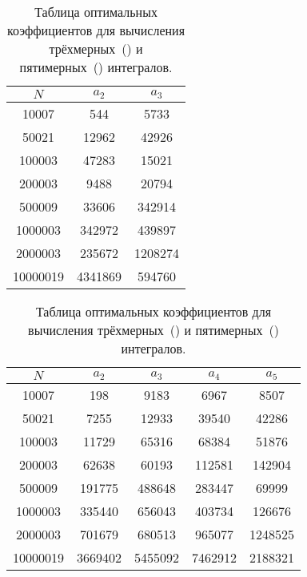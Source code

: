 \documentclass[a4paper,12pt]{article}
\begin{document}
\begin{table}
    \caption{Таблица оптимальных коэффициентов для вычисления трёхмерных~()
        и пятимерных~() интегралов.}
    \label{tab:Korobov}
    {\footnotesize
    \begin{subtable}[b]{.4\linewidth}
        \centering
    	\subcaption{}\label{tab:Korobov-a}
        \begin{tabular}{|c|c|c|}\hline
               \(N\) & \(a_2\) & \(a_3\)  \\\hline
               10007 &     544 &    5733  \\
               50021 &   12962 &   42926  \\
              100003 &   47283 &   15021  \\
              200003 &    9488 &   20794  \\
              500009 &   33606 &  342914  \\
             1000003 &  342972 &  439897  \\
             2000003 &  235672 & 1208274  \\
            10000019 & 4341869 &  594760  \\\hline
    	\end{tabular}
    \end{subtable}
    \begin{subtable}[b]{.6\linewidth}
        \centering
    	\subcaption{}\label{tab:Korobov-b}
        \begin{tabular}{|c|c|c|c|c|}\hline
               \(N\) & \(a_2\) & \(a_3\) & \(a_4\) & \(a_5\)  \\\hline
               10007 &     198 &    9183 &    6967 &    8507  \\
               50021 &    7255 &   12933 &   39540 &   42286  \\
              100003 &   11729 &   65316 &   68384 &   51876  \\
              200003 &   62638 &   60193 &  112581 &  142904  \\
              500009 &  191775 &  488648 &  283447 &   69999  \\
             1000003 &  335440 &  656043 &  403734 &  126676  \\
             2000003 &  701679 &  680513 &  965077 & 1248525  \\
            10000019 & 3669402 & 5455092 & 7462912 & 2188321  \\\hline
    	\end{tabular}
    \end{subtable}}
\end{table}
\end{document}

